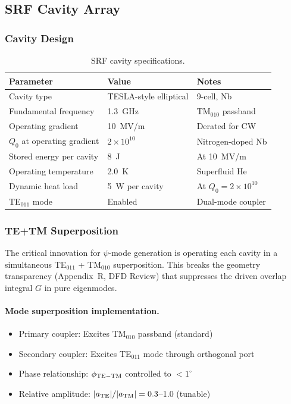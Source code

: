 \documentclass[11pt,letterpaper]{article}
\begin{document}
\subsection{SRF Cavity Array}

\subsubsection{Cavity Design}

\begin{table}[H]
\caption{SRF cavity specifications.}
\begin{tabular}{lll}
\toprule
Parameter & Value & Notes \\
\midrule
Cavity type & TESLA-style elliptical & 9-cell, Nb \\
Fundamental frequency & 1.3~GHz & TM$_{010}$ passband \\
Operating gradient & 10~MV/m & Derated for CW \\
$Q_0$ at operating gradient & $2 \times 10^{10}$ & Nitrogen-doped Nb \\
Stored energy per cavity & 8~J & At 10~MV/m \\
Operating temperature & 2.0~K & Superfluid He \\
Dynamic heat load & 5~W per cavity & At $Q_0 = 2 \times 10^{10}$ \\
TE$_{011}$ mode & Enabled & Dual-mode coupler \\
\bottomrule
\end{tabular}
\end{table}

\subsubsection{TE+TM Superposition}

The critical innovation for $\psi$-mode generation is operating each
cavity in a simultaneous TE$_{011}$ + TM$_{010}$ superposition. This
breaks the geometry transparency (Appendix~R, DFD Review) that
suppresses the driven overlap integral $G$ in pure eigenmodes.

\paragraph{Mode superposition implementation.}
\begin{itemize}
\item Primary coupler: Excites TM$_{010}$ passband (standard)
\item Secondary coupler: Excites TE$_{011}$ mode through orthogonal port
\item Phase relationship: $\phi_{\rm TE-TM}$ controlled to $< 1^\circ$
\item Relative amplitude: $|a_{\rm TE}|/|a_{\rm TM}| = 0.3$--1.0 (tunable)
\end{itemize}
\end{document}
